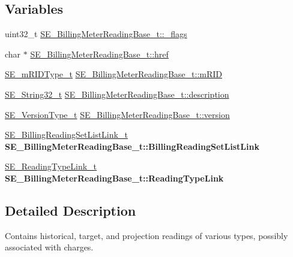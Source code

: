 \subsection*{Variables}
\begin{DoxyCompactItemize}
\item 
uint32\+\_\+t \hyperlink{group__BillingMeterReadingBase_gaaf4d07e6731aca4df6cca42280ee9ca1}{S\+E\+\_\+\+Billing\+Meter\+Reading\+Base\+\_\+t\+::\+\_\+flags}
\item 
char $\ast$ \hyperlink{group__BillingMeterReadingBase_gacf167cf8dec1ec50f0bf44c9a435c015}{S\+E\+\_\+\+Billing\+Meter\+Reading\+Base\+\_\+t\+::href}
\item 
\hyperlink{group__mRIDType_gac74622112f3a388a2851b2289963ba5e}{S\+E\+\_\+m\+R\+I\+D\+Type\+\_\+t} \hyperlink{group__BillingMeterReadingBase_ga4d3e02d27b9cf9d0a4db6c1b44043dd8}{S\+E\+\_\+\+Billing\+Meter\+Reading\+Base\+\_\+t\+::m\+R\+ID}
\item 
\hyperlink{group__String32_gac9f59b06b168b4d2e0d45ed41699af42}{S\+E\+\_\+\+String32\+\_\+t} \hyperlink{group__BillingMeterReadingBase_gad79a5edd8db86eed58f82bb771dcfb51}{S\+E\+\_\+\+Billing\+Meter\+Reading\+Base\+\_\+t\+::description}
\item 
\hyperlink{group__VersionType_ga4b8d27838226948397ed99f67d46e2ae}{S\+E\+\_\+\+Version\+Type\+\_\+t} \hyperlink{group__BillingMeterReadingBase_gaf9273eafca8a17231e43186c95b13cb0}{S\+E\+\_\+\+Billing\+Meter\+Reading\+Base\+\_\+t\+::version}
\item 
\mbox{\label{group__BillingMeterReadingBase_ga39d6fdd2e31350d42e7564c5ac1041ba}} 
\hyperlink{structSE__BillingReadingSetListLink__t}{S\+E\+\_\+\+Billing\+Reading\+Set\+List\+Link\+\_\+t} {\bfseries S\+E\+\_\+\+Billing\+Meter\+Reading\+Base\+\_\+t\+::\+Billing\+Reading\+Set\+List\+Link}
\item 
\mbox{\label{group__BillingMeterReadingBase_ga54e8bdfd80ea033068927c0d7c5c2dcf}} 
\hyperlink{structSE__ReadingTypeLink__t}{S\+E\+\_\+\+Reading\+Type\+Link\+\_\+t} {\bfseries S\+E\+\_\+\+Billing\+Meter\+Reading\+Base\+\_\+t\+::\+Reading\+Type\+Link}
\end{DoxyCompactItemize}


\subsection{Detailed Description}
Contains historical, target, and projection readings of various types, possibly associated with charges. 


